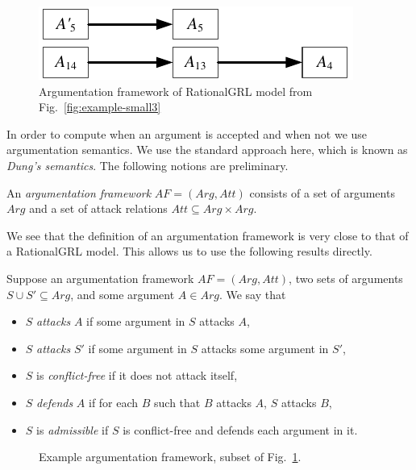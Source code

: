 \begin{figure}[ht]
\centering
\includegraphics[width=\columnwidth]{img/Example1-new-arguments}
\caption{Argumentation framework of RationalGRL model from Fig.~\ref{fig:example-small3}}
\label{fig:example-small4}
\end{figure} 


In order to compute when an argument is accepted and when not we use argumentation semantics.  We use the standard approach here, which is known as \emph{Dung's semantics}. The following notions are preliminary.

\begin{definition}
\label{def:argumentation-framework}
An \emph{argumentation framework} $AF=(Arg,Att)$ consists of a set of arguments $Arg$ and a set of attack relations $Att\subseteq Arg\times Arg.$
\end{definition}

We see that the definition of an argumentation framework is very close to that of a RationalGRL model. This allows us to use the following results directly.

\begin{definition} Suppose an argumentation framework $AF=(Arg,Att)$, two sets of arguments $S\cup S'\subseteq Arg$, and some argument $A\in Arg$. We say that
\begin{itemize}
\item $S$ \emph{attacks} $A$ if some argument in $S$ attacks $A$,
\item $S$ \emph{attacks} $S'$ if some argument in $S$ attacks some argument in $S'$,
\item $S$ is \emph{conflict-free} if it does not attack itself,
\item $S$ \emph{defends} $A$ if for each $B$ such that $B$ attacks $A$, $S$ attacks $B$,
\item $S$ is \emph{admissible} if $S$ is conflict-free and defends each argument in it.
\end{itemize}
\end{definition}

\begin{figure}[ht!]
\centering
{}
\caption{Example argumentation framework, subset of Fig.~\ref{fig:example-small4}.}
\label{fig:goalmodeling:arg2}
\end{figure}

